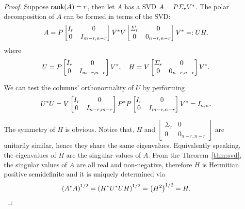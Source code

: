 \documentclass[12pt]{article}
\begin{document}
\begin{proof}
    Suppose $\mathrm{rank}(A) = r$, then let $A$ has a SVD $A = P\varSigma_r V^*$. The polar decomposition of $A$ can be formed in terms of the SVD:
    \begin{equation}
        \notag 
        A = P
        \begin{bmatrix}
            I_r & 0 \\
            0 & I_{m-r,n-r}
        \end{bmatrix}
        V^* V 
        \begin{bmatrix}
            \varSigma_r & 0 \\
            0 & 0_{n-r,n-r}
        \end{bmatrix}
        V^* =: UH.
    \end{equation}
    where 
    \begin{equation}
        \notag 
        U = P
        \begin{bmatrix}
            I_r & 0 \\
            0 & I_{m-r,n-r}
        \end{bmatrix}
        V^*
        ,\quad 
        H = 
        V 
        \begin{bmatrix}
            \varSigma_r & 0 \\
            0 & 0_{n-r,n-r}
        \end{bmatrix}
        V^*.
    \end{equation}
    
    We can test the columns' orthonormality of $U$ by performing
    \begin{equation}
        \notag 
        U^* U = V
        \begin{bmatrix}
            I_r & 0 \\ 0 & I_{n - r, m-r}
        \end{bmatrix}
        P^* P
        \begin{bmatrix}
            I_r & 0 \\ 0 & I_{m-r,n-r}
        \end{bmatrix}
        V^* = I_{n,n}.
    \end{equation}

    The symmetry of $H$ is obvious. Notice that, $H$ and $\begin{bmatrix} \Sigma_r & 0 \\ 0 & 0_{n-r,n-r}\end{bmatrix}$ are unitarily similar, hence they share the same eigenvalues. Equivalently speaking, the eigenvalues of $H$ are the singular values of $A$. From the Theorem~\ref{thm:svd}, the singular values of $A$ are all real and non-negative, therefore $H$ is Hermitian positive semidefinite and it is uniquely determined via 
    \begin{equation}
        \left(A^* A\right)^{1/2} = \left(H^* U^* U H\right)^{1/2} = \left(H^2\right)^{1/2} = H.
    \end{equation}


\end{proof}
\end{document}
